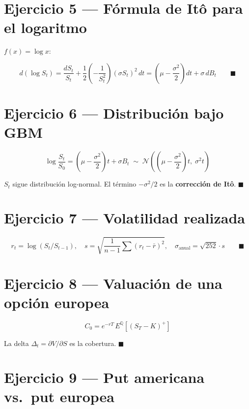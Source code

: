 \documentclass[12pt,letterpaper]{article}
\begin{document}
\section*{Ejercicio 5 --- F\'ormula de It\^o para el logaritmo}

$f(x) = \log x$:

\[
  d(\log S_t) = \frac{dS_t}{S_t} + \frac{1}{2}\!\left(-\frac{1}{S_t^2}\right)
    (\sigma S_t)^2\,dt
  = \left(\mu - \frac{\sigma^2}{2}\right)dt + \sigma\,dB_t \qquad \blacksquare
\]

\section*{Ejercicio 6 --- Distribuci\'on bajo GBM}

\[
  \log\frac{S_t}{S_0} = \left(\mu-\frac{\sigma^2}{2}\right)t + \sigma B_t
  \;\sim\; \mathcal{N}\!\!\left(\left(\mu-\frac{\sigma^2}{2}\right)t,\;\sigma^2 t\right)
\]

$S_t$ sigue distribuci\'on log-normal. El t\'ermino $-\sigma^2/2$ es la
\textbf{correcci\'on de It\^o}. $\blacksquare$

\section*{Ejercicio 7 --- Volatilidad realizada}

\[
  r_t = \log(S_t/S_{t-1}), \quad
  s = \sqrt{\frac{1}{n-1}\sum(r_t-\bar{r})^2}, \quad
  \sigma_{\text{anual}} = \sqrt{252}\cdot s \qquad \blacksquare
\]

\section*{Ejercicio 8 --- Valuaci\'on de una opci\'on europea}

\[
  C_0 = e^{-rT}\,E^\mathbb{Q}[(S_T-K)^+]
\]

La delta $\Delta_t = \partial V/\partial S$ es la cobertura. $\blacksquare$

\section*{Ejercicio 9 --- Put americana vs.\ put europea}
\end{document}
